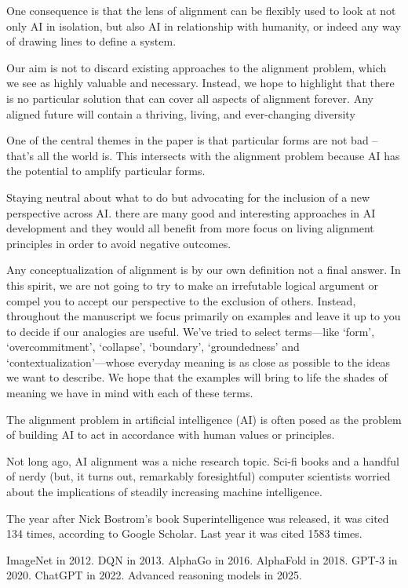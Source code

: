 One consequence is that the lens of alignment can be flexibly used to look at not only AI in isolation, but also AI in relationship with humanity, or indeed any way of drawing lines to define a system.


Our aim is not to discard existing approaches to the alignment problem, which we see as highly valuable and necessary. Instead, we hope to highlight that there is no particular solution that can cover all aspects of alignment forever. Any aligned future will contain a thriving, living, and ever-changing diversity 

One of the central themes in the paper is that particular forms are not bad -- that's all the world is. This intersects with the alignment problem because AI has the potential to amplify particular forms. 

Staying neutral about what to do but advocating for the inclusion of a new perspective across AI. there are many good and interesting approaches in AI development and they would all benefit from more focus on living alignment principles in order to avoid negative outcomes. 


Any conceptualization of alignment is by our own definition not a final answer. In this spirit, we are not going to try to make an irrefutable logical argument or compel you to accept our perspective to the exclusion of others. Instead, throughout the manuscript we focus primarily on examples and leave it up to you to decide if our analogies are useful. We've tried to select terms---like `form', `overcommitment', `collapse', `boundary', `groundedness' and `contextualization'---whose everyday meaning is as close as possible to the ideas we want to describe. We hope that the examples will bring to life the shades of meaning we have in mind with each of these terms.


The alignment problem in artificial intelligence (AI) is often posed as the problem of building AI to act in accordance with human values or principles.

Not long ago, AI alignment was a niche research topic. Sci-fi books and a handful of nerdy (but, it turns out, remarkably foresightful) computer scientists worried about the implications of steadily increasing machine intelligence. 

The year after Nick Bostrom's book Superintelligence was released, it was cited 134 times, according to Google Scholar. Last year it was cited 1583 times. 

ImageNet in 2012. DQN in 2013. AlphaGo in 2016. AlphaFold in 2018. GPT-3 in 2020. ChatGPT in 2022. Advanced reasoning models in 2025. 

